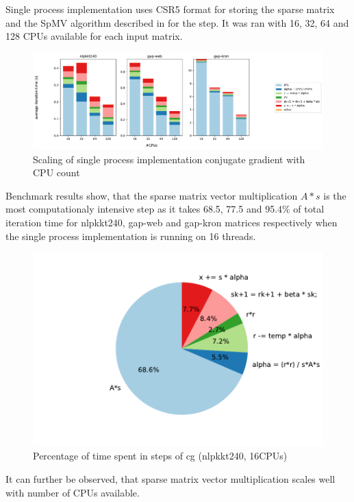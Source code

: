 \documentclass[thesis=M,english]{FITthesis}[2019/12/23]
\begin{document}
Single process implementation uses CSR5 format for storing the sparse matrix and the
SpMV algorithm  described in \cite{liu2015csr5} for the  step. It was ran
with 16, 32, 64 and 128 CPUs available for each input matrix.

\begin{figure}[htp]
    \centering
    \includegraphics[scale=0.35]{static/single_process.pdf}
    \caption{Scaling of single process implementation conjugate gradient with CPU count}
\end{figure}

Benchmark results show, that the sparse matrix vector multiplication
$A * s$ is the most computationaly intensive step as it takes 68.5, 77.5 and 95.4\% of
total iteration time for nlpkkt240, gap-web and gap-kron matrices respectively when
the single process implementation is running on 16 threads.


\begin{figure}[htp]
    \centering
    \includegraphics[scale=0.6]{static/cg_sp_nlpkkt240_16.pdf}
    \caption{Percentage of time spent in steps of cg (nlpkkt240, 16CPUs)}
\end{figure}


It can further be observed, that sparse matrix vector multiplication scales well with
number of CPUs available.
\end{document}
